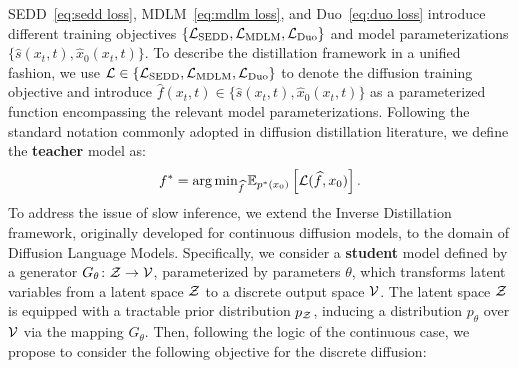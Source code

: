   SEDD~\eqref{eq:sedd loss}, MDLM~\eqref{eq:mdlm loss}, and Duo~\eqref{eq:duo loss} introduce different training objectives $\{\mathcal{L}_{\text{SEDD}}, \mathcal{L}_{\text{MDLM}}, \mathcal{L}_{\text{Duo}}\}$ 
  and model parameterizations $\{\widehat{s}(x_t,t), \widehat{x}_0(x_t,t)\}$.
  To describe the distillation framework in a unified fashion, we use $\mathcal{L} \in \{\mathcal{L}_{\text{SEDD}}, \mathcal{L}_{\text{MDLM}}, \mathcal{L}_{\text{Duo}}\}$ to denote the diffusion training objective and introduce $\widehat{f}(x_t,t) \in \{\widehat{s}(x_t,t), \widehat{x}_0(x_t,t)\}$ as a parameterized function encompassing the relevant model parameterizations. Following the standard notation commonly adopted in diffusion distillation literature, we define the \textbf{teacher} model as:
  \begin{equation}
    f^* = \arg\min\nolimits_{\widehat{f}} \mathbb{E}_{p^*(x_0)} \left[\mathcal{L}(\widehat{f}, x_0)\right] \nonumber.
  \end{equation}
  To address the issue of slow inference, we extend the Inverse Distillation framework, originally developed for continuous diffusion models, to the domain of Diffusion Language Models.
  Specifically, we consider a \textbf{student} model defined by a generator ${G_{\theta}\colon \mathcal{Z} \to \mathcal{V}}$, parameterized by parameters $\theta$, which transforms latent variables from a latent space $\mathcal{Z}$ to a discrete output space $\mathcal{V}$. The latent space $\mathcal{Z}$ is equipped with a tractable prior distribution $p_{\mathcal{Z}}$, inducing a distribution $p_{\theta}$ over $\mathcal{V}$ via the mapping $G_{\theta}$. Then, following the logic of the continuous case, we propose to consider the following objective for the discrete diffusion:
  
